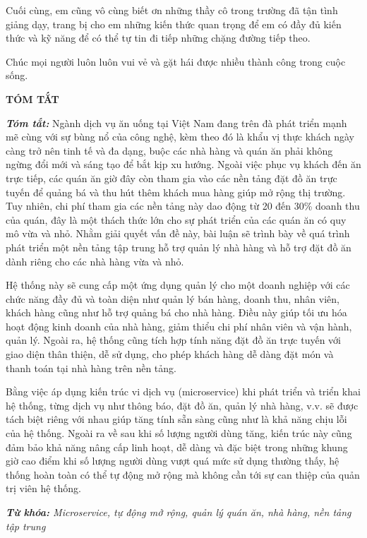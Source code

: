 Cuối cùng, em cũng vô cùng biết ơn những thầy cô trong trường đã tận tình giảng dạy, trang bị cho em những kiến thức quan trọng để em có đầy đủ kiến thức và kỹ năng để có thể tự tin đi tiếp những chặng đường tiếp theo.

Chúc mọi người luôn luôn vui vẻ và gặt hái được nhiều thành công trong cuộc sống.

\newpage
{}
\begin{center}
    \textbf{TÓM TẮT}
\end{center}
\changefontsizes[16pt]{12pt}
\textit{\textbf{Tóm tắt: }} 
Ngành dịch vụ ăn uống tại Việt Nam đang trên đà phát triển mạnh mẽ cùng với sự bùng nổ của công nghệ, kèm theo đó là khẩu vị thực khách ngày càng trở nên tinh tế và đa dạng, buộc các nhà hàng và quán ăn phải không ngừng đổi mới và sáng tạo để bắt kịp xu hướng.
Ngoài việc phục vụ khách đến ăn trực tiếp, các quán ăn giờ đây còn tham gia vào các nền tảng đặt đồ ăn trực tuyến để quảng bá và thu hút thêm khách mua hàng giúp mở rộng thị trường.
Tuy nhiên, chi phí tham gia các nền tảng này dao động từ 20 đến 30\% doanh thu của quán, đây là một thách thức lớn cho sự phát triển của các quán ăn có quy mô vừa và nhỏ.
Nhằm giải quyết vấn đề này, bài luận sẽ trình bày về quá trình phát triển một nền tảng tập trung hỗ trợ quản lý nhà hàng và hỗ trợ đặt đồ ăn dành riêng cho các nhà hàng vừa và nhỏ.

Hệ thống này sẽ cung cấp một ứng dụng quản lý cho một doanh nghiệp với các chức năng đầy đủ và toàn diện như quản lý bán hàng, doanh thu, nhân viên, khách hàng cũng như hỗ trợ quảng bá cho nhà hàng.
Điều này giúp tối ưu hóa hoạt động kinh doanh của nhà hàng, giảm thiểu chi phí nhân viên và vận hành, quản lý.
Ngoài ra, hệ thống cũng tích hợp tính năng đặt đồ ăn trực tuyến với giao diện thân thiện, dễ sử dụng, cho phép khách hàng dễ dàng đặt món và thanh toán tại nhà hàng trên nền tảng.

Bằng việc áp dụng kiến trúc vi dịch vụ (microservice) khi phát triển và triển khai hệ thống, từng dịch vụ như thông báo, đặt đồ ăn, quản lý nhà hàng, v.v. sẽ được tách biệt riêng với nhau giúp tăng tính sẵn sàng cũng như là khả năng chịu lỗi của hệ thống.
Ngoài ra về sau khi số lượng người dùng tăng, kiến trúc này cũng đảm bảo khả năng nâng cấp linh hoạt, dễ dàng và đặc biệt trong những khung giờ cao điểm khi số lượng người dùng vượt quá mức sử dụng thường thấy, hệ thống hoàn toàn có thể tự động mở rộng mà không cần tới sự can thiệp của quản trị viên hệ thống.
\vspace{-0.5cm}
\begin{flushleft}
  \textit{\textbf{Từ khóa: } Microservice, tự động mở rộng, quản lý quán ăn, nhà hàng, nền tảng tập trung}
\end{flushleft}

